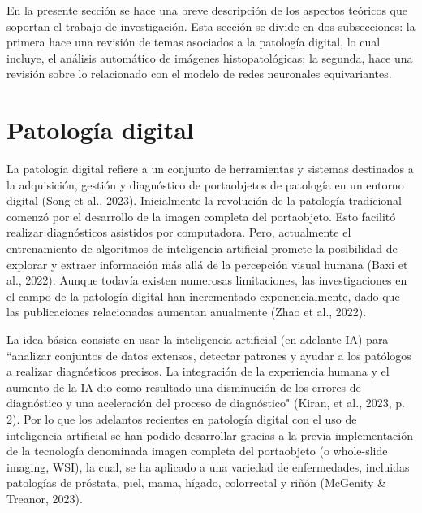 \documentclass[12pt,letterpaper,final, openany]{scrbook}
\begin{document}

En la presente sección se hace una breve descripción de los aspectos teóricos que soportan el trabajo de investigación. Esta sección se divide en dos subsecciones: la primera hace una revisión de temas asociados a la patología digital, lo cual incluye, el análisis automático de imágenes histopatológicas; la segunda, hace una revisión sobre lo relacionado con el modelo de redes neuronales equivariantes.

\section{Patología digital}

La patología digital refiere a un conjunto de herramientas y sistemas destinados a la adquisición, gestión y diagnóstico de portaobjetos de patología en un entorno digital (Song et al., 2023). Inicialmente la revolución de la patología tradicional comenzó por el desarrollo de la imagen completa del portaobjeto. Esto facilitó realizar diagnósticos asistidos por computadora. Pero, actualmente el entrenamiento de algoritmos de inteligencia artificial promete la posibilidad de explorar y extraer información más allá de la percepción visual humana (Baxi et al., 2022). Aunque todavía existen numerosas limitaciones, las investigaciones en el campo de la patología digital han incrementado exponencialmente, dado que las publicaciones relacionadas aumentan anualmente (Zhao et al., 2022). 

La idea básica consiste en usar la inteligencia artificial (en adelante IA) para ``analizar conjuntos de datos extensos, detectar patrones y ayudar a los patólogos a realizar diagnósticos precisos. La integración de la experiencia humana y el aumento de la IA dio como resultado una disminución de los errores de diagnóstico y una aceleración del proceso de diagnóstico"  (Kiran, et al., 2023, p. 2). Por lo que los adelantos recientes en patología digital con el uso de inteligencia artificial se han podido desarrollar gracias a la previa implementación de la tecnología denominada imagen completa del portaobjeto (o whole-slide imaging, WSI), la cual, se ha aplicado a una variedad de enfermedades, incluidas patologías de próstata, piel, mama, hígado, colorrectal y riñón (McGenity \& Treanor, 2023).
\end{document}
